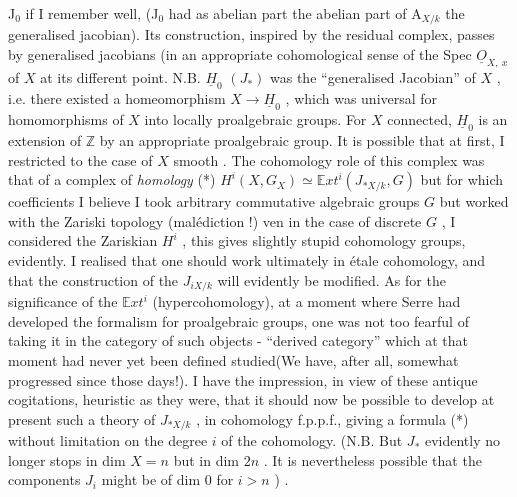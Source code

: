 
J$_0$ if I remember well, (J$_0$ had as abelian part the abelian part of A$_{X/k}$\hand{)}
the  generalised jacobian). Its construction, inspired by the
residual complex, passes by generalised jacobians (in an appropriate cohomological
sense\hand{)} of the  Spec $\underline{O}_{X,\ x}$ of $X$ at its different point.
N.B. $\underline{H}_0$ $(J_*)$ was the ``generalised Jacobian'' of $X$ , i.e. there existed a
homeomorphism $X \to \underline{H}_0$ , which was universal for homomorphisms of $X$ into 
locally proalgebraic groups. For $X$ connected, $\underline{H}_0$ is an extension of $\mathbb{Z}$
by an appropriate proalgebraic group.
It is possible that\hand{,} at first, I restricted to the case of $X$ smooth .
The cohomology role of this complex was that of a complex of \textit{homology}
(*) $H^i(X, G_X) \simeq \mathbb{E}xt^i(J_{*X/k}, G)$ but for which coefficients I believe
I took arbitrary commutative algebraic groups $G$ but worked with the
Zariski topology (malédiction !) ven in the case of discrete $G$ , I considered
the Zariskian $H^i$ , this gives slightly stupid cohomology groups, evidently.
I realised that one should work ultimately in étale cohomology, and that
the construction of the \hand{(}$J$\hand{)}$_{iX/k}$ will evidently be modified. As for the
significance of the $\mathbb{E}xt^i$ (hypercohomology), at a moment where Serre had
developed the formalism for proalgebraic groups, one was not too fearful of
taking it in the category of such objects -  ``derived category''
which at that moment had never yet been  defined  studied(We have, after
all, somewhat progressed since those days!). I have the impression, in
view of these antique cogitations, heuristic as they were, that it should
now be possible to develop at present such a theory of $J_{*X/k}$ , in cohomology
f.p.p.f., giving a formula (*) without limitation on the degree $i$ of the
cohomology. (N.B. But $J_*$ evidently no longer stops in dim $X = n$ but
in dim $2n$ . It is nevertheless possible that the components $J_i$ might be
of dim 0 for $i > n$ ) .

